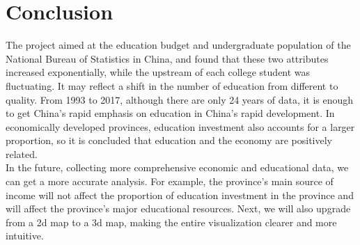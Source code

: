 \section{Conclusion}
\label{sec:conclusion}

The project aimed at the education budget and undergraduate population of the National Bureau of Statistics in China, and found that these two attributes increased exponentially, while the upstream of each college student was fluctuating. It may reflect a shift in the number of education from different to quality. \cite{dougherty1995supervised}From 1993 to 2017, although there are only 24 years of data, it is enough to get China's rapid emphasis on education in China's rapid development. In economically developed provinces, education investment also accounts for a larger proportion, so it is concluded that education and the economy are positively related.\\

\noindent In the future, collecting more comprehensive economic and educational data, we can get a more accurate analysis.\cite{dibiase1992animation} For example, the province’s main source of income will not affect the proportion of education investment in the province and will affect the province’s major educational resources. Next, we will also upgrade from a 2d map to a 3d map, making the entire visualization clearer and more intuitive. 
